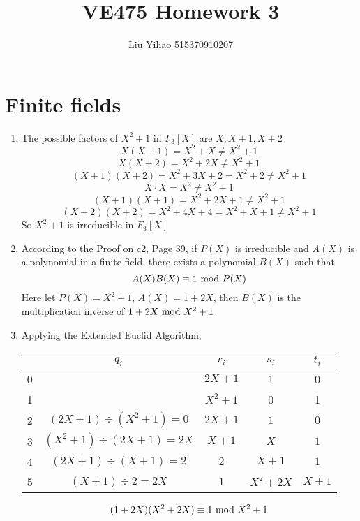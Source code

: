 \documentclass{article}
\title{VE475 Homework 3}
\author{Liu Yihao 515370910207}
\date{}
\renewcommand{\mod}{{\rm\ mod\ }}
\begin{document}
\maketitle

\section{Finite fields}
\begin{enumerate}
\item
The possible factors of $X^2+1$ in $F_3[X]$ are $X,X+1,X+2$ 
$$X(X+1)=X^2+X\neq X^2+1$$
$$X(X+2)=X^2+2X\neq X^2+1$$
$$(X+1)(X+2)=X^2+3X+2=X^2+2\neq X^2+1$$
$$X\cdot X=X^2\neq X^2+1$$
$$(X+1)(X+1)=X^2+2X+1\neq X^2+1$$
$$(X+2)(X+2)=X^2+4X+4=X^2+X+1\neq X^2+1$$
So $X^2+1$ is irreducible in $F_3[X]$
\item
According to the Proof on c2, Page 39, if $P(X)$ is irreducible and $A(X)$ is a polynomial in a finite field, there exists a polynomial $B(X)$ such that $$A(X)B(X)\equiv1\mod P(X)$$
Here let $P(X)=X^2+1$, $A(X)=1+2X$, then $B(X)$ is the multiplication inverse of $1+2X\mod X^2+1$.
\item
Applying the Extended Euclid Algorithm,
\begin{center}
\begin{tabular}{|c|c|c|c|c|}
\hline
& $q_i$ & $r_i$ & $s_i$ & $t_i$\\\hline
0 & & $2X+1$ & 1 & 0\\\hline
1 & & $X^2+1$ & 0 & 1\\\hline
2 & $(2X+1)\div(X^2+1)=0$ & $2X+1$ & $1$ & $0$\\\hline
3 & $(X^2+1)\div(2X+1)=2X$ & $X+1$ & $X$ & $1$\\\hline
4 & $(2X+1)\div(X+1)=2$ & $2$ & $X+1$ & $1$\\\hline
5 & $(X+1)\div2=2X$ & $1$ & $X^2+2X$ & $X+1$\\\hline
\end{tabular}
\end{center}
$$(1+2X)(X^2+2X)\equiv1\mod X^2+1$$
\end{enumerate}
\end{document}
